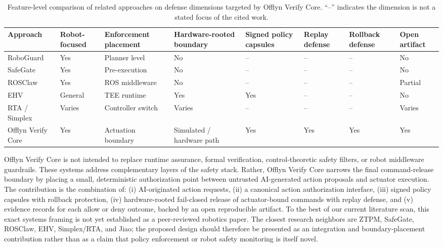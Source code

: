 \documentclass[10pt]{article}
\newcommand{\ovc}{Offlyn Verify Core\xspace}
\begin{document}
\begin{table}[t]
\centering
\small
\caption{Feature-level comparison of related approaches on defense dimensions targeted by \ovc. ``--'' indicates the dimension is not a stated focus of the cited work.}
\label{tab:comparison}
\begin{tabularx}{\textwidth}{>{\raggedright\arraybackslash}p{2.7cm}>{\centering\arraybackslash}p{1.5cm}>{\centering\arraybackslash}p{2.0cm}>{\centering\arraybackslash}p{2.0cm}>{\centering\arraybackslash}p{1.5cm}>{\centering\arraybackslash}p{1.5cm}>{\centering\arraybackslash}p{1.5cm}>{\centering\arraybackslash}p{1.5cm}}
\toprule
Approach & Robot-focused & Enforcement placement & Hardware-rooted boundary & Signed policy capsules & Replay defense & Rollback defense & Open artifact \\
\midrule
RoboGuard & Yes & Planner level & No & -- & -- & -- & No \\
SafeGate & Yes & Pre-execution & No & -- & -- & -- & No \\
ROSClaw & Yes & ROS middleware & No & -- & -- & -- & Partial \\
EHV & General & TEE runtime & Yes & Yes & -- & -- & No \\
RTA / Simplex & Varies & Controller switch & Varies & -- & -- & -- & Varies \\
\ovc & Yes & Actuation boundary & Simulated / hardware path & Yes & Yes & Yes & Yes \\
\bottomrule
\end{tabularx}
\end{table}

\ovc is not intended to replace runtime assurance, formal verification, control-theoretic safety filters, or robot middleware guardrails. These systems address complementary layers of the safety stack. Rather, \ovc narrows the final command-release boundary by placing a small, deterministic authorization point between untrusted AI-generated action proposals and actuator execution. The contribution is the combination of: (i) AI-originated action requests, (ii) a canonical action authorization interface, (iii) signed policy capsules with rollback protection, (iv) hardware-rooted fail-closed release of actuator-bound commands with replay defense, and (v) evidence records for each allow or deny outcome, backed by an open reproducible artifact. To the best of our current literature scan, this exact systems framing is not yet established as a peer-reviewed robotics paper. The closest research neighbors are ZTPM, SafeGate, ROSClaw, EHV, Simplex/RTA, and Jiao; the proposed design should therefore be presented as an integration and boundary-placement contribution rather than as a claim that policy enforcement or robot safety monitoring is itself novel.
\end{document}
